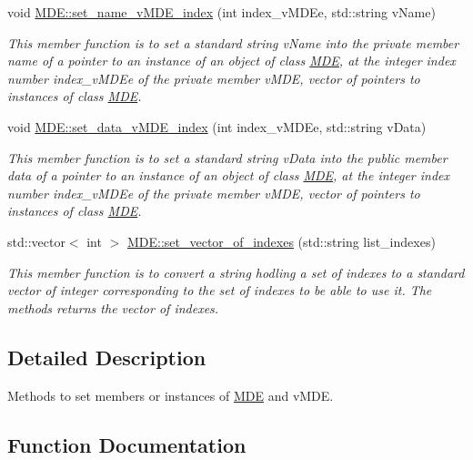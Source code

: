 \begin{DoxyCompactItemize}
void \hyperlink{group__group__set_gaa140f8ec04b385dad147e8d4defc8434}{M\+D\+E\+::set\+\_\+name\+\_\+v\+M\+D\+E\+\_\+index} (int index\+\_\+v\+M\+D\+Ee, std\+::string v\+Name)
\begin{DoxyCompactList}\small\item\em This member function is to set a standard string v\+Name into the private member \textquotesingle{}name\textquotesingle{} of a pointer to an instance of an object of class \hyperlink{classMDE}{M\+DE}, at the integer index number index\+\_\+v\+M\+D\+Ee of the private member v\+M\+DE, vector of pointers to instances of class \hyperlink{classMDE}{M\+DE}. \end{DoxyCompactList}\item 
void \hyperlink{group__group__set_ga5dee98068559783970fd355f7183add7}{M\+D\+E\+::set\+\_\+data\+\_\+v\+M\+D\+E\+\_\+index} (int index\+\_\+v\+M\+D\+Ee, std\+::string v\+Data)
\begin{DoxyCompactList}\small\item\em This member function is to set a standard string v\+Data into the public member \textquotesingle{}data\textquotesingle{} of a pointer to an instance of an object of class \hyperlink{classMDE}{M\+DE}, at the integer index number index\+\_\+v\+M\+D\+Ee of the private member v\+M\+DE, vector of pointers to instances of class \hyperlink{classMDE}{M\+DE}. \end{DoxyCompactList}\item 
std\+::vector$<$ int $>$ \hyperlink{group__group__set_ga509b0f655b4883bbf55b97bf71bf177b}{M\+D\+E\+::set\+\_\+vector\+\_\+of\+\_\+indexes} (std\+::string list\+\_\+indexes)
\begin{DoxyCompactList}\small\item\em This member function is to convert a string hodling a set of indexes to a standard vector of integer corresponding to the set of indexes to be able to use it. The methods returns the vector of indexes. \end{DoxyCompactList}\end{DoxyCompactItemize}


\subsection{Detailed Description}
Methods to set members or instances of \hyperlink{classMDE}{M\+DE} and v\+M\+DE. 

\subsection{Function Documentation}

